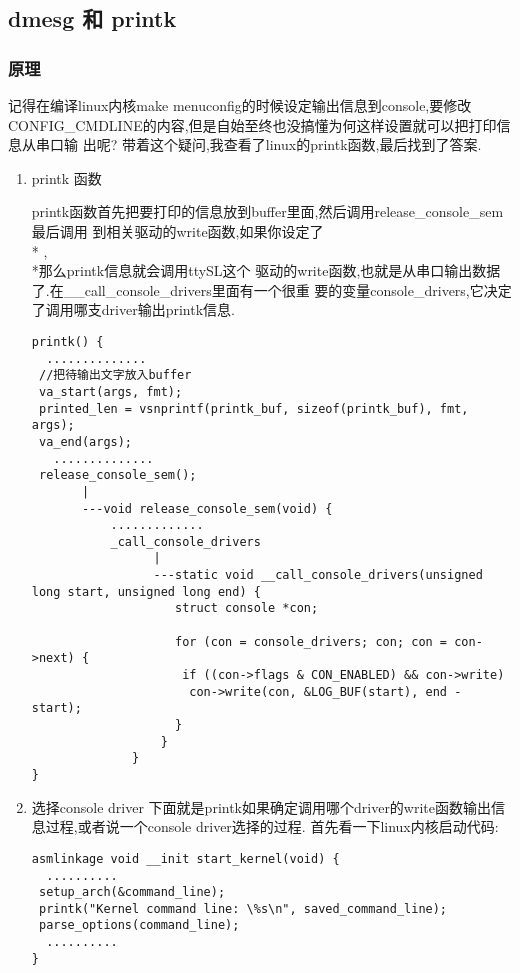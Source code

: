 \documentclass[a4paper,titlepage]{article}
\begin{document}
\subsection{dmesg 和 printk}
\subsubsection{原理}
记得在编译linux内核make menuconfig的时候设定输出信息到console,要修改
CONFIG_CMDLINE的内容,但是自始至终也没搞懂为何这样设置就可以把打印信息从串口输
出呢? 带着这个疑问,我查看了linux的printk函数,最后找到了答案.
\begin{enumerate}
    \item  printk 函数

printk函数首先把要打印的信息放到buffer里面,然后调用release_console_sem最后调用
到相关驱动的write函数,如果你设定了 \\*
,\\*那么printk信息就会调用ttySL这个
驱动的write函数,也就是从串口输出数据了.在__call_console_drivers里面有一个很重
要的变量console_drivers,它决定了调用哪支driver输出printk信息.

\begin{lstlisting}
printk() {
  ..............  
 //把待输出文字放入buffer
 va_start(args, fmt);
 printed_len = vsnprintf(printk_buf, sizeof(printk_buf), fmt, args);
 va_end(args); 
   ..............  
 release_console_sem();
       |
       ---void release_console_sem(void) {
           .............
           _call_console_drivers
                 |
                 ---static void __call_console_drivers(unsigned long start, unsigned long end) {
                    struct console *con;
                   
                    for (con = console_drivers; con; con = con->next) {
                     if ((con->flags & CON_ENABLED) && con->write)
                      con->write(con, &LOG_BUF(start), end - start);
                    }
                  }
              }
}
\end{lstlisting}

\item 选择console driver 
下面就是printk如果确定调用哪个driver的write函数输出信息过程,或者说一个console driver选择的过程.
首先看一下linux内核启动代码:

\begin{lstlisting}
asmlinkage void __init start_kernel(void) {
  ..........  
 setup_arch(&command_line);
 printk("Kernel command line: \%s\n", saved_command_line);
 parse_options(command_line);
  ..........
}


\end{lstlisting}
\end{enumerate}
\end{document}
